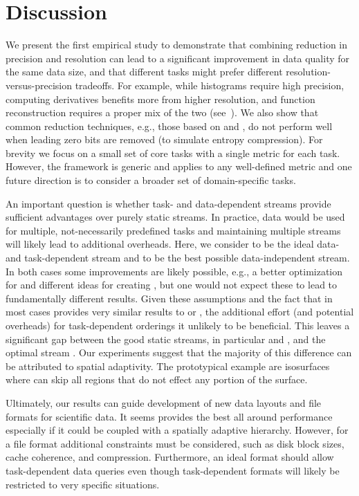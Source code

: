 \section{Discussion}

We present the first empirical study to demonstrate that combining reduction in precision and
resolution can lead to a significant improvement in data quality for the same data size, and that
different tasks might prefer different resolution-versus-precision tradeoffs. For example, while
histograms require high precision, computing derivatives benefits more from higher resolution, and
function reconstruction requires a proper mix of the two (see~). We also show
that common reduction techniques, e.g., those based on \slvl and \smag, do not perform well when
leading zero bits are removed (to simulate entropy compression). For brevity we focus on a small set
of core tasks with a single metric for each task. However, the framework is generic and applies to
any well-defined metric and one future direction is to consider a broader set of domain-specific
tasks. 

An important question is whether task- and data-dependent streams provide sufficient advantages over
purely static streams. In practice, data would be used for multiple, not-necessarily predefined tasks
and maintaining multiple streams will likely lead to additional overheads. Here, we consider \sopt
to be the ideal data- and task-dependent stream and \ssig to be the best possible data-independent
stream. In both cases some improvements are likely possible, e.g., a better optimization for \sopt
and different ideas for creating \ssig, but one would not expect these to lead to fundamentally
different results. Given these assumptions and the fact that \ssig in most cases provides very
similar results to \sbit or \swav, the additional effort (and potential overheads) for
task-dependent orderings it unlikely to be beneficial. This leaves a significant gap between the
good static streams, in particular \swav and \sbit, and the optimal stream \sopt. Our experiments
suggest that the majority of this difference can be attributed to spatial adaptivity. The
prototypical example are isosurfaces where \sopt can skip all regions that do not effect any
portion of the surface.

Ultimately, our results can guide development of new data layouts and file formats for scientific
data. It seems \swav provides the best all around performance especially if it could be coupled with
a spatially adaptive hierarchy. However, for a file format additional constraints must be
considered, such as disk block sizes, cache coherence, and compression. Furthermore, an ideal format
should allow task-dependent data queries even though task-dependent formats will likely be
restricted to very specific situations. 

